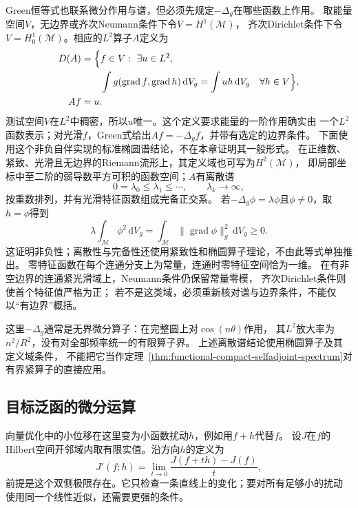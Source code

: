 Green恒等式也联系微分作用与谱，但必须先规定$-\Delta_g$在哪些函数上作用。
取能量空间$V$，无边界或齐次Neumann条件下令$V=H^1(\mathcal M)$，
齐次Dirichlet条件下令$V=H_0^1(\mathcal M)$。相应的$L^2$算子$A$定义为
\[
 \begin{aligned}
 D(A)&=\Bigl\{f\in V:\ \exists u\in L^2,\\
 &\qquad\int g(\operatorname{grad}f,\operatorname{grad}h)\,\mathrm dV_g
 =\int uh\,\mathrm dV_g\quad\forall h\in V\Bigr\},\\
 Af&=u.
 \end{aligned}
\]
测试空间$V$在$L^2$中稠密，所以$u$唯一。这个定义要求能量的一阶作用确实由
一个$L^2$函数表示；对光滑$f$，Green式给出$Af=-\Delta_gf$，并带有选定的边界条件。
下面使用这个非负自伴实现的标准椭圆谱结论，不在本章证明其一般形式。
在正维数、紧致、光滑且无边界的Riemann流形上，其定义域也可写为$H^2(\mathcal M)$，
即局部坐标中至二阶的弱导数平方可积的函数空间；$A$有离散谱
\[
 0=\lambda_0\leq\lambda_1\leq\cdots,\qquad\lambda_k\longrightarrow\infty,
\]
按重数排列，并有光滑特征函数组成完备正交系。
若$-\Delta_g\phi=\lambda\phi$且$\phi\neq0$，取$h=\phi$得到
\[
 \lambda\int_{\mathcal M}\phi^2\,\mathrm dV_g
 =\int_{\mathcal M}\lVert\operatorname{grad}\phi\rVert_g^2\,\mathrm dV_g
 \geq0.
\]
这证明非负性；离散性与完备性还使用紧致性和椭圆算子理论，不由此等式单独推出。
零特征函数在每个连通分支上为常量，连通时零特征空间恰为一维。
在有非空边界的连通紧光滑域上，Neumann条件仍保留常量零模，
齐次Dirichlet条件则使首个特征值严格为正；
若不是这类域，必须重新核对谱与边界条件，不能仅以“有边界”概括。


这里$-\Delta_g$通常是无界微分算子：在完整圆上对$\cos(n\theta)$作用，
其$L^2$放大率为$n^2/R^2$，没有对全部频率统一的有限算子界。
上述离散谱结论使用椭圆算子及其定义域条件，
不能把它当作定理~\ref{thm:functional-compact-selfadjoint-spectrum}对有界紧算子的直接应用。

\subsection{目标泛函的微分运算}
\label{sec:functional-objective-differentiation}

向量优化中的小位移在这里变为小函数扰动$h$，例如用$f+h$代替$f$。
设$J$在$f$的Hilbert空间开邻域内取有限实值。沿方向$h$的定义为
\[
 J'(f;h)=\lim_{t\to0}\frac{J(f+th)-J(f)}{t},
\]
前提是这个双侧极限存在。它只检查一条直线上的变化；要对所有足够小的扰动
使用同一个线性近似，还需要更强的条件。

